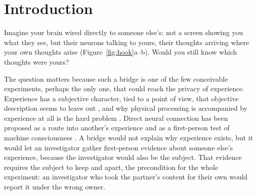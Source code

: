 \section{Introduction}

Imagine your brain wired directly to someone else's: not a screen
showing you what they see, but their neurons talking to yours, their
thoughts arriving where your own thoughts arise
(Figure~\ref{fig:hook}a--b). Would you still know which thoughts were
yours?


The question matters because such a bridge is one of the few
conceivable experiments, perhaps the only one, that could reach the
privacy of experience. Experience has a subjective character, tied to a
point of view, that objective description seems to leave out
\citep{nagel1974bat}, and why physical processing is accompanied by
experience at all is the hard problem \citep{chalmers1995facing}.
Direct neural connection has been proposed as a route into another's
experience
\citep{ramachandran1997qualia,hirstein2008mindmelding,hirstein2012mindmelding}
and as a first-person test of machine consciousness
\citep{watanabe2022biological,watanabe2023uploading}. A bridge would not explain why
experience exists, but it would let an investigator gather first-person
evidence about someone else's experience, because the investigator
would also be the subject. That evidence requires the subject to keep
 and  apart, the precondition for the whole
experiment: an investigator who took the partner's content for their
own would report it under the wrong owner.

